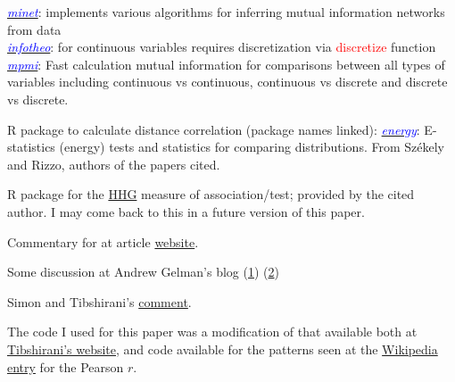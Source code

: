 \documentclass[english,nohyper,titlepage]{tufte-handout}\usepackage{graphicx, color}
\begin{document}
\noindent\href{http://www.bioconductor.org/packages/2.12/bioc/html/minet.html}{\textcolor{blue}{\emph{minet}}}: implements various algorithms for inferring mutual information networks from data\\
\noindent\href{http://cran.r-project.org/web/packages/infotheo}{\textcolor{blue}{\emph{infotheo}}}: for continuous variables requires discretization via \textcolor{red}{discretize} function \\
\noindent\href{http://r-forge.r-project.org/projects/mpmi/}{\textcolor{blue}{\emph{mpmi}}}: Fast calculation mutual information for comparisons between all types of variables including continuous vs continuous, continuous vs discrete and discrete vs discrete.

\medskip
\noindent R package to calculate distance correlation (package names linked):
\noindent\href{http://cran.r-project.org/web/packages/energy/}{\textcolor{blue}{\emph{energy}}}: E-statistics (energy) tests and statistics for comparing distributions. From Sz\'{e}kely and Rizzo, authors of the papers cited.

\medskip
\noindent R package for the \href{http://www.math.tau.ac.il/~ruheller/Software.html}{HHG} measure of association/test; provided by the cited author.  I may come back to this in a future version of this paper.

\medskip
\noindent Commentary for \citet{reshef_detecting_2011} at article \href{http://comments.sciencemag.org/content/10.1126/science.1205438}{website}.

\medskip
\noindent Some discussion at Andrew Gelman's blog (\href{http://andrewgelman.com/2011/12/16/mr-pearson-meet-mr-mandelbrot-detecting-novel-associations-in-large-data-sets/}{1}) (\href{http://andrewgelman.com/2012/03/26/further-thoughts-on-nonparametric-correlation-measures/}{2}) 
\medskip

\noindent Simon and Tibshirani's \href{http://www-stat.stanford.edu/~tibs/reshef/comment.pdf}{comment}.
\medskip


\noindent The code I used for this paper was a modification of that available both at \href{http://www-stat.stanford.edu/~tibs/reshef/script.R}{Tibshirani's website}, and code available for the patterns seen at the \href{http://en.wikipedia.org/wiki/File:Correlation_examples2.svg}{Wikipedia entry} for the Pearson $r$.
\end{document}
